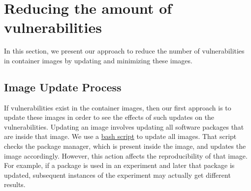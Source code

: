 \documentclass[a4paper,num-refs]{oup-contemporary}
\begin{document}
\section{Reducing the amount of vulnerabilities}

In this section, we present our approach to reduce the number of
vulnerabilities in container images  by updating and minimizing these
images.

\subsection{Image Update Process}

If vulnerabilities exist in the container images, then our first approach
is to update these images in order to see the effects of such updates
on the vulnerabilities.
Updating an image involves updating all software packages that are
inside that image. We use a 
\href{https://github.com/kaurbhupinder/Vulnerability-Analysis/blob/master/Scripts/update/update.sh}{bash script} 
to update all images. That script checks the
package manager, which is present inside the image, and updates the image
accordingly. However, this action affects the reproducibility
of that image. For example, if a package is used in an experiment
and later that package is updated, subsequent instances of the experiment may actually
get different results.
\end{document}
